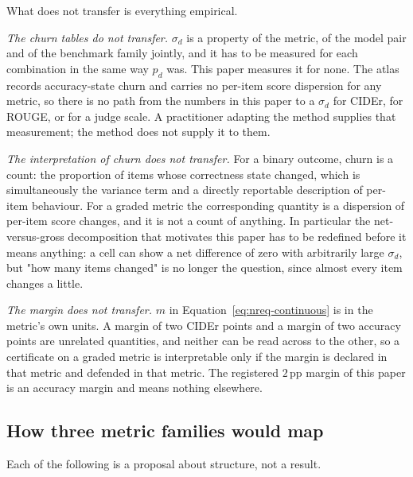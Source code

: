 What does not transfer is everything empirical.

\emph{The churn tables do not transfer.} $\sigma_d$ is a property of the metric,
of the model pair and of the benchmark family jointly, and it has to be measured
for each combination in the same way $p_d$ was. This paper measures it for none.
The atlas records accuracy-state churn and carries no per-item score dispersion
for any metric, so there is no path from the numbers in this paper to a
$\sigma_d$ for CIDEr, for ROUGE, or for a judge scale. A practitioner adapting
the method supplies that measurement; the method does not supply it to them.

\emph{The interpretation of churn does not transfer.} For a binary outcome,
churn is a count: the proportion of items whose correctness state changed, which
is simultaneously the variance term and a directly reportable description of
per-item behaviour. For a graded metric the corresponding quantity is a
dispersion of per-item score changes, and it is not a count of anything. In
particular the net-versus-gross decomposition that motivates this paper has to
be redefined before it means anything: a cell can show a net difference of zero
with arbitrarily large $\sigma_d$, but "how many items changed" is no longer the
question, since almost every item changes a little.

\emph{The margin does not transfer.} $m$ in
Equation~\eqref{eq:nreq-continuous} is in the metric's own units. A margin of two
CIDEr points and a margin of two accuracy points are unrelated quantities, and
neither can be read across to the other, so a certificate on a graded metric is
interpretable only if the margin is declared in that metric and defended in that
metric. The registered $2$\,pp margin of this paper is an accuracy margin and
means nothing elsewhere.

\subsection{How three metric families would map}
\label{app:continuous:families}

Each of the following is a proposal about structure, not a result.

